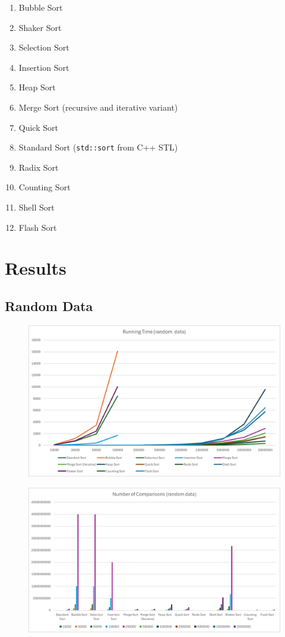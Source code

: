 \documentclass{article}
\begin{document}
\begin{enumerate}
	\item Bubble Sort
	\item Shaker Sort
	\item Selection Sort
	\item Insertion Sort
	\item Heap Sort
	\item Merge Sort (recursive and iterative variant)
	\item Quick Sort
	\item Standard Sort (\texttt{std::sort} from C++ STL)
	\item Radix Sort
	\item Counting Sort
	\item Shell Sort
	\item Flash Sort
\end{enumerate}


\pagebreak


\section{Results}


\subsection{Random Data}


\begin{figure}[ht]
	\centering
	\includegraphics[width=14cm]{images/time_random.png}
\end{figure}

\begin{figure}[ht]
	\centering
	\includegraphics[width=14cm]{images/comp_random.png}
\end{figure}
\end{document}
